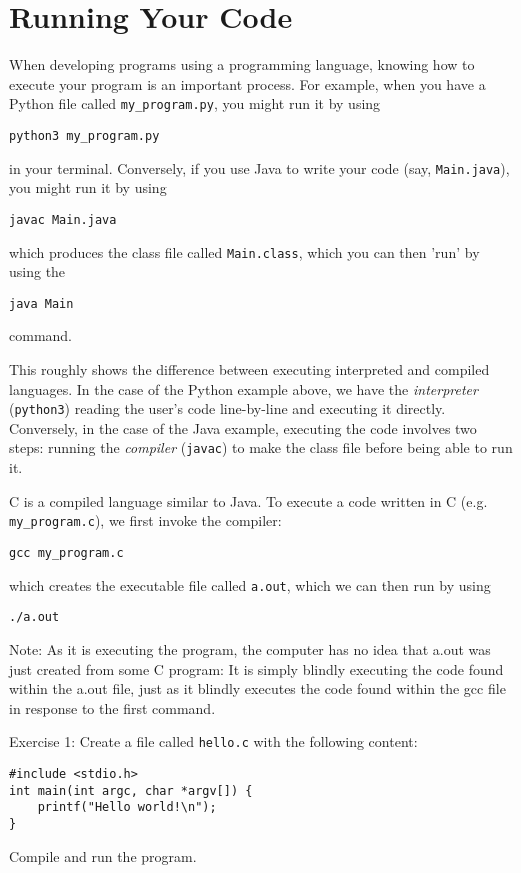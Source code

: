 \documentclass[oneside]{book}
\begin{document}
\chapter{Running Your Code}
When developing programs using a programming language, knowing how to execute your program is an important process. For example, when you have a Python file called \verb|my_program.py|, you might run it by using 
\begin{verbatim}
python3 my_program.py
\end{verbatim}
in your terminal. Conversely, if you use Java to write your code (say, \verb|Main.java|), you might run it by using
\begin{verbatim}
javac Main.java
\end{verbatim}
which produces the class file called \verb|Main.class|, which you can then 'run' by using the
\begin{verbatim}
java Main
\end{verbatim}
command.

\pagebreak

This roughly shows the difference between executing interpreted and compiled languages. In the case of the Python example above, we have the \textit{interpreter} (\verb|python3|) reading the user's code line-by-line and executing it directly. Conversely, in the case of the Java example, executing the code involves two steps: running the \textit{compiler} (\verb|javac|) to make the class file before being able to run it.

C is a compiled language similar to Java. To execute a code written in C (e.g. \verb|my_program.c|), we first invoke the compiler:
\begin{verbatim}
gcc my_program.c
\end{verbatim}
which creates the executable file called \verb|a.out|, which we can then run by using
\begin{verbatim}
./a.out
\end{verbatim}

Note: As it is executing the program, the computer has no idea that a.out was just created from some C program: It is simply blindly executing the code found within the a.out file, just as it blindly executes the code found within the gcc file in response to the first command. %

Exercise 1:
Create a file called \verb|hello.c| with the following content:
\begin{verbatim}
#include <stdio.h>
int main(int argc, char *argv[]) {
    printf("Hello world!\n");
}
\end{verbatim}
Compile and run the program.
\end{document}
